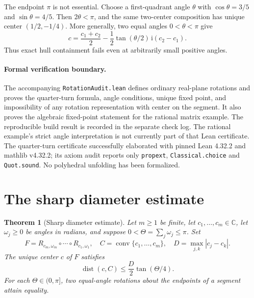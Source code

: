 \documentclass[11pt,letterpaper]{article}
\newtheorem{theorem}{Theorem}
\newcommand{\ii}{\mathrm{i}}
\newcommand{\conv}{\operatorname{conv}}
\newcommand{\dist}{\operatorname{dist}}
\begin{document}
The endpoint $\pi$ is not essential. Choose a first-quadrant angle $\theta$
with $\cos\theta=3/5$ and $\sin\theta=4/5$. Then $2\theta<\pi$, and the
same two-center composition has unique center $(1/2,-1/4)$. More generally,
two equal angles $0<\theta<\pi$ give
\[
 c=\frac{c_1+c_2}{2}
   -\frac12\tan(\theta/2)\,\ii(c_2-c_1).
\]
Thus exact hull containment fails even at arbitrarily small positive angles.

\paragraph{Formal verification boundary.}
The accompanying \texttt{RotationAudit.lean} defines ordinary real-plane
rotations and proves the quarter-turn formula, angle conditions, unique fixed
point, and impossibility of any rotation representation with center on the
segment. It also proves the algebraic fixed-point statement for the rational
matrix example. The reproducible build result is recorded in the separate check
log. The rational
example's strict angle interpretation is not currently part of that Lean
certificate. The quarter-turn certificate successfully elaborated with pinned
Lean 4.32.2 and mathlib v4.32.2; its axiom audit reports only
\texttt{propext}, \texttt{Classical.choice} and \texttt{Quot.sound}.
No polyhedral unfolding has been formalized.

\section{The sharp diameter estimate}
\begin{theorem}[Sharp diameter estimate]
Let $m\ge1$ be finite, let $c_1,\dots,c_m\in\mathbb C$, let $\omega_j\ge0$
be angles in radians, and suppose
$0<\Theta=\sum_j\omega_j\le\pi$. Set
\[
 F=R_{c_m,\omega_m}\circ\cdots\circ R_{c_1,\omega_1},\quad
 C=\conv\{c_1,\dots,c_m\},\quad D=\max_{j,k}|c_j-c_k|.
\]
The unique center $c$ of $F$ satisfies
\[
 \dist(c,C)\le\frac D2\tan(\Theta/4).
\]
For each $\Theta\in(0,\pi]$, two equal-angle rotations about the endpoints
of a segment attain equality.
\end{theorem}
\end{document}
